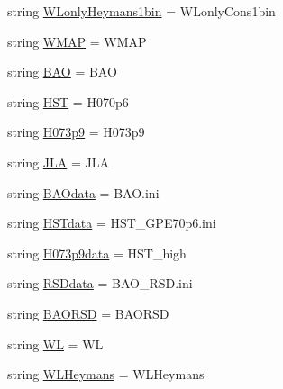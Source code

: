 \begin{DoxyCompactItemize}
string \mbox{\hyperlink{namespaceplanck_1_1settings__planck__2015_a5f7bc64cb1238773fe9697ab03557e24}{W\+Lonly\+Heymans1bin}} = \textquotesingle{}W\+Lonly\+Cons1bin\textquotesingle{}
\item 
string \mbox{\hyperlink{namespaceplanck_1_1settings__planck__2015_a11ccfea42b7e06d477594502a93d9e6b}{W\+M\+AP}} = \textquotesingle{}W\+M\+AP\textquotesingle{}
\item 
string \mbox{\hyperlink{namespaceplanck_1_1settings__planck__2015_a13c1148a7d97e3efecfd5232156a362b}{B\+AO}} = \textquotesingle{}B\+AO\textquotesingle{}
\item 
string \mbox{\hyperlink{namespaceplanck_1_1settings__planck__2015_a07bbdc37cac88460480c8e0389b1c0a2}{H\+ST}} = \textquotesingle{}H070p6\textquotesingle{}
\item 
string \mbox{\hyperlink{namespaceplanck_1_1settings__planck__2015_aafef97d4fa4c419c1ae40783e5ee77bc}{H073p9}} = \textquotesingle{}H073p9\textquotesingle{}
\item 
string \mbox{\hyperlink{namespaceplanck_1_1settings__planck__2015_a228e145e679385378b71ad2948b85ba1}{J\+LA}} = \textquotesingle{}J\+LA\textquotesingle{}
\item 
string \mbox{\hyperlink{namespaceplanck_1_1settings__planck__2015_a3a0245a3f6747c382d1d88bec289dda2}{B\+A\+Odata}} = \textquotesingle{}B\+A\+O.\+ini\textquotesingle{}
\item 
string \mbox{\hyperlink{namespaceplanck_1_1settings__planck__2015_a53ddf3faa0f7b268ebbbbcd6bb491d68}{H\+S\+Tdata}} = \textquotesingle{}H\+S\+T\+\_\+\+G\+P\+E70p6.\+ini\textquotesingle{}
\item 
string \mbox{\hyperlink{namespaceplanck_1_1settings__planck__2015_a149e32b6407ecf68b56504a5911c02ee}{H073p9data}} = \textquotesingle{}H\+S\+T\+\_\+high\textquotesingle{}
\item 
string \mbox{\hyperlink{namespaceplanck_1_1settings__planck__2015_a9bc2f64151649f9e4a8d4a961d797094}{R\+S\+Ddata}} = \textquotesingle{}B\+A\+O\+\_\+\+R\+S\+D.\+ini\textquotesingle{}
\item 
string \mbox{\hyperlink{namespaceplanck_1_1settings__planck__2015_aa1979503708bc66f1a5ca6c26181194a}{B\+A\+O\+R\+SD}} = \textquotesingle{}B\+A\+O\+R\+SD\textquotesingle{}
\item 
string \mbox{\hyperlink{namespaceplanck_1_1settings__planck__2015_aa1d1a83b8a1a78949591d158a6ed5188}{WL}} = \textquotesingle{}WL\textquotesingle{}
\item 
string \mbox{\hyperlink{namespaceplanck_1_1settings__planck__2015_a3c67b8a390704c0dd6d3ee12ba851a4b}{W\+L\+Heymans}} = \textquotesingle{}W\+L\+Heymans\textquotesingle{}

\end{DoxyCompactItemize}
